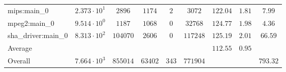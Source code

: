 \begin{tabular}{|l|c|c|c|c|c|c|c|c|}
mips:main\_0            & $ 2.373 \cdot 10^{1} $ & $ 2896   $ & $ 1174  $ & $ 2   $ & $ 3072   $ & $ 122.04      $ & $ 1.81    $ & $ 7.99    $ \\
mpeg2:main\_0           & $ 9.514 \cdot 10^{0} $ & $ 1187   $ & $ 1068  $ & $ 0   $ & $ 32768  $ & $ 124.77      $ & $ 1.98    $ & $ 4.36    $ \\
sha\_driver:main\_0     & $ 8.313 \cdot 10^{2} $ & $ 104070 $ & $ 2606  $ & $ 0   $ & $ 117248 $ & $ 125.19      $ & $ 2.01    $ & $ 66.59   $ \\
\hline
Average                 & $                    $ & $        $ & $       $ & $     $ & $        $ & $ 112.55      $ & $ 0.95    $ & $         $ \\
\hline
Overall                 & $ 7.664 \cdot 10^{3} $ & $ 855014 $ & $ 63402 $ & $ 343 $ & $ 771904 $ & $             $ & $         $ & $ 793.32  $ \\
\hline
\end{tabular}
